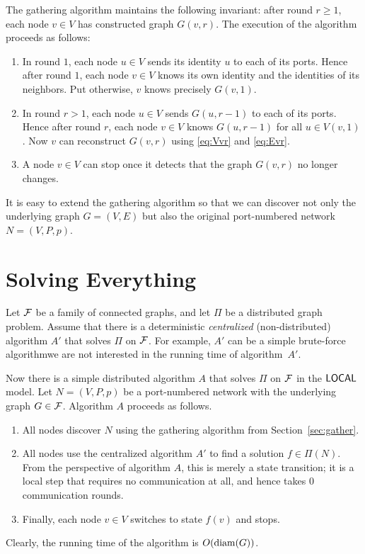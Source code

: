 The gathering algorithm maintains the following invariant: after round $r \ge 1$, each node $v \in V$ has constructed graph $G(v,r)$. The execution of the algorithm proceeds as follows:
\begin{enumerate}
    \item In round $1$, each node $u \in V$ sends its identity $u$ to each of its ports. Hence after round $1$, each node $v \in V$ knows its own identity and the identities of its neighbors. Put otherwise, $v$ knows precisely $G(v,1)$.
    \item In round $r > 1$, each node $u \in V$ sends $G(u,r-1)$ to each of its ports. Hence after round $r$, each node $v \in V$ knows $G(u,r-1)$ for all $u \in V(v,1)$. Now $v$ can reconstruct $G(v,r)$ using \eqref{eq:Vvr} and \eqref{eq:Evr}.
    \item A node $v \in V$ can stop once it detects that the graph $G(v,r)$ no longer changes.
\end{enumerate}

It is easy to extend the gathering algorithm so that we can discover not only the underlying graph $G = (V,E)$ but also the original port-numbered network $N = (V,P,p)$.


\section{Solving Everything}

Let $\mathcal{F}$ be a family of connected graphs, and let $\Pi$ be a distributed graph problem. Assume that there is a deterministic \emph{centralized} (non-distributed) algorithm $A'$ that solves $\Pi$ on $\mathcal{F}$. For example, $A'$ can be a simple brute-force algorithm\mydash we are not interested in the running time of algorithm~$A'$.

Now there is a simple distributed algorithm $A$ that solves $\Pi$ on $\mathcal{F}$ in the $\textup{\sffamily LOCAL}$ model. Let $N = (V,P,p)$ be a port-numbered network with the underlying graph $G \in \mathcal{F}$. Algorithm $A$ proceeds as follows.
\begin{enumerate}
    \item All nodes discover $N$ using the gathering algorithm from Section~\ref{sec:gather}.
    \item All nodes use the centralized algorithm $A'$ to find a solution $f \in \Pi(N)$. From the perspective of algorithm $A$, this is merely a state transition; it is a local step that requires no communication at all, and hence takes $0$ communication rounds.
    \item Finally, each node $v \in V$ switches to state $f(v)$ and stops.
\end{enumerate}
Clearly, the running time of the algorithm is $O(\operatorname{diam}(G))$.

